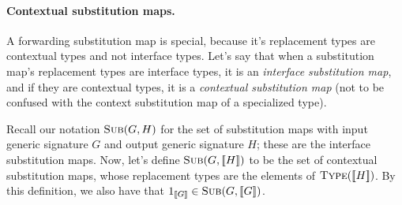 \documentclass[../generics]{subfiles}
\begin{document}
\paragraph{Contextual substitution maps.} A forwarding substitution map is special, because it's replacement types are contextual types and not interface types. Let's say that when a substitution map's replacement types are interface types, it is an \emph{interface substitution map}, and if they are contextual types, it is a \emph{contextual substitution map} (not to be confused with the context substitution map of a specialized type).

Recall our notation $\textsc{Sub}({G, H})$ for the set of substitution maps with input generic signature $G$ and output generic signature $H$; these are the interface substitution maps. Now, let's define $\textsc{Sub}({G, [\![H]\!]})$ to be the set of contextual substitution maps, whose replacement types are the elements of  $\textsc{Type}({[\![H]\!]})$. By this definition, we also have that $1_{[\![G]\!]}\in\textsc{Sub}({G, [\![G]\!]})$.
\end{document}
